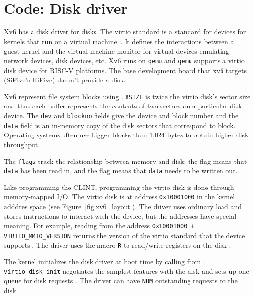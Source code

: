 \section{Code: Disk driver}

Xv6 has a disk driver for  disks. The
virtio standard is a standard for devices for kernels that run on a
virtual machine~\cite{virtio}.  It defines the interactions between a guest kernel
and the virtual machine monitor for virtual devices emulating network
devices, disk devices, etc.  Xv6 runs on \texttt{qemu} and
\texttt{qemu} supports a virtio disk device for RISC-V platforms.  The
base development board that xv6 targets (SiFive's HiFive) doesn't
provide a disk.

Xv6 represent file system blocks using
.
\lstinline{BSIZE}
is twice the virtio disk's sector size and thus
each buffer represents the contents of two sectors on a particular
disk device.  The
\lstinline{dev}
and
\lstinline{blockno}
fields give the device and block
number and the
\lstinline{data}
field is an in-memory copy of the disk sectors that correspond to block.
Operating systems often use
bigger blocks than 1,024 bytes to obtain higher disk throughput.

The
\lstinline{flags}
track the relationship between memory and disk:
the
flag means that
\lstinline{data}
has been read in, and
the 
flag means that
\lstinline{data}
needs to be written out.

Like programming the CLINT, programming the virtio disk is done
through memory-mapped I/O.  The virtio disk is at address
\lstinline{0x10001000} in the kernel adddres space (see
Figure~\ref{fig:xv6_layout}).  The driver uses ordinary load and
stores instructions to interact with the device, but the addresses
have special meaning.  For example, reading from the address
\lstinline{0x10001000 + VIRTIO_MMIO_VERSION}
 returns the version of the virtio
standard that the device supports
.  The driver uses the
macro \lstinline{R} to read/write registers on the disk
.

The kernel initializes the disk driver at boot time by calling
 from
 .
\lstinline{virtio_disk_init} negotiates the simplest features with the
disk  and sets
up one queue for disk requests .  The driver can have
\lstinline{NUM} outstanding requests to the disk.


